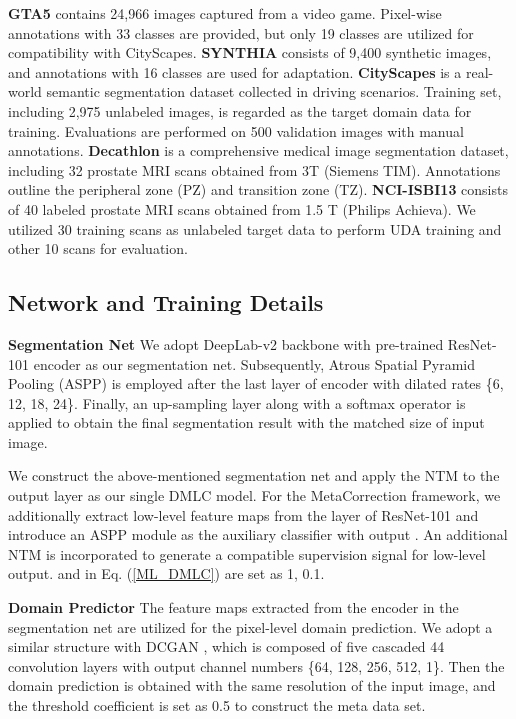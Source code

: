 \documentclass[final]{cvpr}
\begin{document}
\textbf{GTA5} contains 24,966 images captured from a video game. Pixel-wise annotations with 33 classes are provided, but only 19 classes are utilized for compatibility with CityScapes. 
\textbf{SYNTHIA} consists of 9,400 synthetic images, and annotations with 16 classes are used for adaptation.
\textbf{CityScapes}  is a real-world semantic segmentation dataset collected in driving scenarios. Training set, including 2,975 unlabeled images, is regarded as the target domain data for training. Evaluations are performed on 500 validation images with manual annotations. 
\textbf{Decathlon} is a comprehensive medical image segmentation dataset, including 32 prostate MRI scans obtained from 3T (Siemens TIM). Annotations outline the peripheral zone (PZ) and transition zone (TZ). \textbf{NCI-ISBI13} consists of 40 labeled prostate MRI scans obtained from 1.5 T (Philips Achieva). We utilized 30 training scans as unlabeled target data to perform UDA training and other 10 scans for evaluation.

\subsection{Network and Training Details}
\vspace{-0.1cm}
\textbf{Segmentation Net} We adopt DeepLab-v2 \cite{chen2017deeplab} backbone with pre-trained ResNet-101 \cite{he2016deep} encoder as our segmentation net. Subsequently, Atrous Spatial Pyramid Pooling (ASPP) is employed after the last layer of encoder with dilated rates \{6, 12, 18, 24\}. Finally, an up-sampling layer along with a softmax operator is applied to obtain the final segmentation result with the matched size of input image. 

We construct the above-mentioned segmentation net and apply the NTM to the output layer as our single DMLC model. For the MetaCorrection framework, we additionally extract low-level feature maps from the  layer of ResNet-101 and introduce an ASPP module as the auxiliary classifier with output . An additional NTM  is incorporated to generate a compatible supervision signal for low-level output.  and  in Eq. (\ref{ML_DMLC}) are set as 1, 0.1. 

\textbf{Domain Predictor} The feature maps extracted from the encoder in the segmentation net are utilized for the pixel-level domain prediction. We adopt a similar structure with DCGAN \cite{radford2015unsupervised}, which is composed of five cascaded 44 convolution layers with output channel numbers \{64, 128, 256, 512, 1\}. Then the domain prediction is obtained with the same resolution of the input image, and the threshold coefficient  is set as 0.5 to construct the meta data set. 
\end{document}
